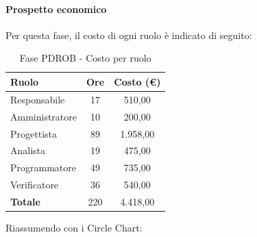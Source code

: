 \documentclass[../PianoProgetto.tex]{subfiles}
\begin{document}
	\paragraph{Prospetto economico}
					Per questa fase, il costo di ogni ruolo è indicato di seguito:
	\begin{table}[h]
		\centering
	
		\begin{tabular}{l * {2}{c}}
			\toprule
			\textbf{Ruolo} & \textbf{Ore} & \textbf{Costo (\euro{})} \\
			\midrule
			Responsabile &	17 & 510,00 \\
			Amministratore & 10 & 200,00 \\
			Progettista & 89 & 1.958,00 \\
			Analista & 19 & 475,00 \\
			Programmatore & 49 & 735,00 \\
			Verificatore & 36 & 540,00 \\
			\midrule		
			\textbf{Totale} & 220 & 4.418,00 \\
			\bottomrule	
		\end{tabular}
		\caption{Fase PDROB - Costo per ruolo}
		\label{tab:fasePDROB_costo}
	\end{table}
\vfill	
\newpage
\vfill
	Riassumendo con i Circle Chart:
\end{document}
